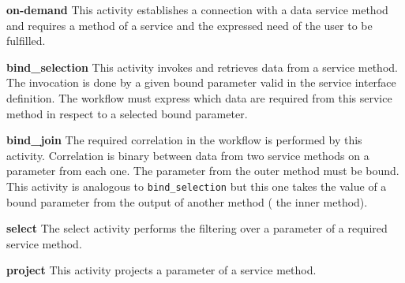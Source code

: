 \documentclass{acm_proc_article-sp}
\begin{document}
\textbf{on-demand} This activity establishes a connection with a data service method and requires a method of a service and the expressed need of the user to be fulfilled.

%



\textbf{bind_selection}
This activity invokes and retrieves data from a service method. The invocation is done by a given bound parameter valid in the service interface definition. The workflow must express which data are required from this service method in respect to a selected bound parameter.

%



\textbf{bind_join} The required correlation in the workflow is performed by this activity. Correlation is binary between data from two service methods on a parameter from each one. The parameter from the outer method must be bound. This activity is analogous to \texttt{bind_selection} but this one takes the value of a bound parameter from the output of another method (\ie{} the inner method).
                     
%


                     
\textbf{select} The select activity performs the filtering over a parameter of a required service method.
            
%


                     
\textbf{project} This activity projects a parameter of a service method.
                     
\end{document}
